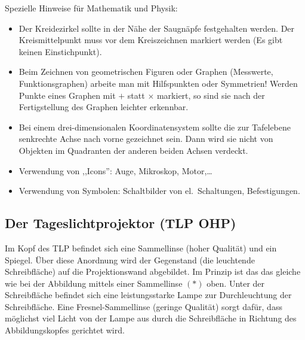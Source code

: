 Spezielle Hinweise f\"{u}r Mathematik und Physik:
\begin{itemize}
\item
Der Kreidezirkel sollte in der N\"{a}he der Saugn\"{a}pfe
festgehalten werden.
Der Kreismittelpunkt muss vor dem Kreiszeichnen markiert werden
(Es gibt keinen Einstichpunkt).
\item
Beim Zeichnen von geometrischen Figuren oder Graphen
(Messwerte, Funktionsgraphen) arbeite man mit Hilfspunkten oder
Symmetrien! Werden Punkte eines Graphen mit $+$ statt $\times$ markiert,
so sind sie nach der Fertigstellung des Graphen leichter
erkennbar.
\item
Bei einem drei-dimensionalen  Koordinatensystem sollte die
zur Tafelebene senkrechte Achse nach vorne gezeichnet sein.
Dann wird sie nicht von Objekten im Quadranten der anderen beiden
Achsen verdeckt.
\item
Verwendung von ,,Icons'':
Auge, Mikroskop, Motor,\dots

\item
Verwendung von Symbolen: Schaltbilder von el.\ Schaltungen,
Befestigungen.
\end{itemize}

\subsection{Der Tageslichtprojektor (TLP OHP)}

Im Kopf des TLP befindet sich eine Sammellinse (hoher Qualit\"{a}t) und ein Spiegel.
\"{U}ber diese Anordnung wird der Gegenstand (die leuchtende Schreibfl\"{a}che) auf die Projektionswand abgebildet.
Im Prinzip ist das das gleiche wie bei der Abbildung mittels einer Sammellinse $(*)$ oben.
\mip
Unter der Schreibfl\"{a}che befindet sich eine leistungsstarke Lampe zur Durchleuchtung der Schreibfl\"{a}che.
Eine Fresnel-Sammellinse (geringe Qualit\"{a}t) sorgt daf\"{u}r, dass m\"{o}glichst viel Licht von der Lampe aus
durch die Schreibfl\"{a}che in Richtung des Abbildungskopfes gerichtet wird.

